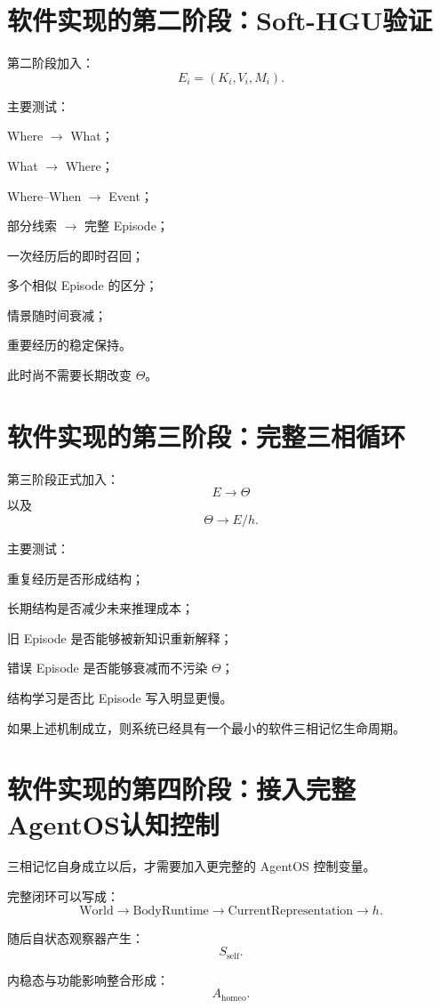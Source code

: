\section{软件实现的第二阶段：Soft-HGU验证}

第二阶段加入：
\[
E_i=(K_i,V_i,M_i).
\]

主要测试：

Where $\rightarrow$ What；

What $\rightarrow$ Where；

Where--When $\rightarrow$ Event；

部分线索 $\rightarrow$ 完整 Episode；

一次经历后的即时召回；

多个相似 Episode 的区分；

情景随时间衰减；

重要经历的稳定保持。

此时尚不需要长期改变 $\Theta$。

\section{软件实现的第三阶段：完整三相循环}

第三阶段正式加入：
\[
E\rightarrow\Theta
\]
以及
\[
\Theta\rightarrow E/h.
\]

主要测试：

重复经历是否形成结构；

长期结构是否减少未来推理成本；

旧 Episode 是否能够被新知识重新解释；

错误 Episode 是否能够衰减而不污染 $\Theta$；

结构学习是否比 Episode 写入明显更慢。

如果上述机制成立，则系统已经具有一个最小的软件三相记忆生命周期。

\section{软件实现的第四阶段：接入完整AgentOS认知控制}

三相记忆自身成立以后，才需要加入更完整的 AgentOS 控制变量。

完整闭环可以写成：
\[
\mathrm{World}
\rightarrow
\mathrm{BodyRuntime}
\rightarrow
\mathrm{CurrentRepresentation}
\rightarrow
h.
\]

随后自状态观察器产生：
\[
S_{\mathrm{self}}.
\]

内稳态与功能影响整合形成：
\[
A_{\mathrm{homeo}}.
\]

